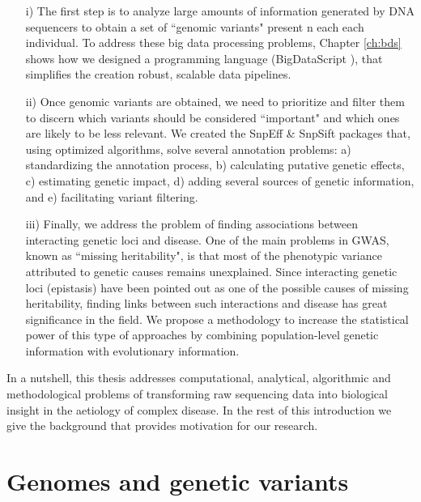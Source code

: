 \begin{itemize}

\item[i)] The first step is to analyze large amounts of information generated by DNA sequencers to obtain a set of ``genomic variants" present n each each individual. To address these big data processing problems, Chapter \ref{ch:bds} shows how we designed a programming language (BigDataScript \cite{cingolani2015bigdatascript}), that simplifies the creation robust, scalable data pipelines.

\item[ii)] Once genomic variants are obtained, we need to prioritize and filter them to discern which variants should be considered ``important" and which ones are likely to be less relevant. We created the SnpEff \& SnpSift \cite{cingolani2012program, cingolani2012using} packages that, using optimized algorithms, solve several annotation problems: a) standardizing the annotation process, b) calculating putative genetic effects, c) estimating genetic impact, d) adding several sources of genetic information, and e) facilitating variant filtering. 
					
\item[iii)] Finally, we address the problem of finding associations between interacting genetic loci and disease. One of the main problems in GWAS, known as ``missing heritability", is that most of the phenotypic variance attributed to genetic causes remains unexplained. Since interacting genetic loci (epistasis) have been pointed out as one of the possible causes of missing heritability, finding links between such interactions and disease has great significance in the field. We propose a methodology to increase the statistical power of this type of approaches by combining population-level genetic information with evolutionary information. 

\end{itemize}

In a nutshell, this thesis addresses computational, analytical, algorithmic and methodological problems of transforming raw sequencing data into biological insight in the aetiology of complex disease. In the rest of this introduction we give the background that provides motivation for our research. 

\section{Genomes and genetic variants \label{sec:introRef}}


